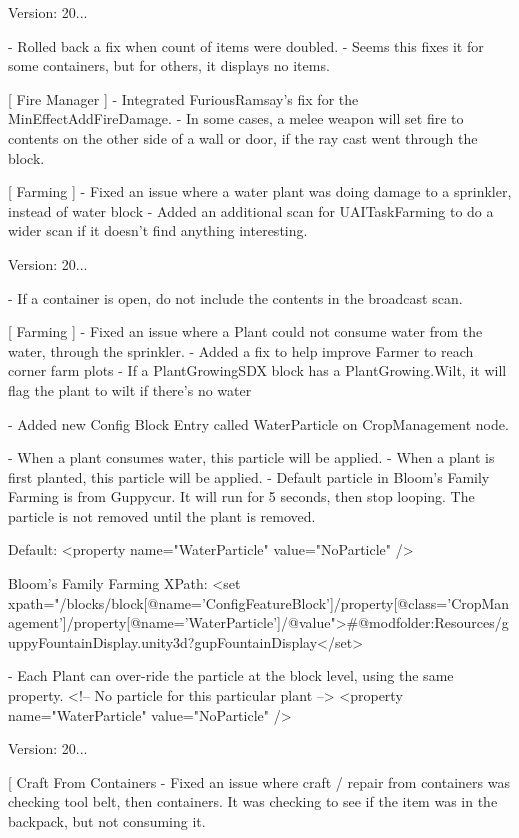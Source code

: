 Version\+: 20... \begin{DoxyVerb}
    - Rolled back a fix when count of items were doubled.
        - Seems this fixes it for some containers, but for others, it displays no items.

[ Fire Manager ]
    - Integrated FuriousRamsay's fix for the MinEffectAddFireDamage.
        - In some cases, a melee weapon will set fire to contents on the other side of a wall or door, if the ray cast went through the block.

[ Farming ]
    - Fixed an issue where a water plant was doing damage to a sprinkler, instead of water block
    - Added an additional scan for UAITaskFarming to do a wider scan if it doesn't find anything interesting.
\end{DoxyVerb}
 Version\+: 20... \begin{DoxyVerb}  
    - If a container is open, do not include the contents in the broadcast scan.

[ Farming ]
    - Fixed an issue where a Plant could not consume water from the water, through the sprinkler.
    - Added a fix to help improve Farmer to reach corner farm plots
    - If a PlantGrowingSDX block has a PlantGrowing.Wilt, it will flag the plant to wilt if there's no water

    - Added new Config Block Entry called WaterParticle on CropManagement node.

        - When a plant consumes water, this particle will be applied.
        - When a plant is first planted, this particle will be applied.
        - Default particle in Bloom's Family Farming is from Guppycur. 
            It will run for 5 seconds, then stop looping.
            The particle is not removed until the plant is removed.

        Default: 
            <property name="WaterParticle" value="NoParticle" />

        Bloom's Family Farming XPath:
            <set xpath="/blocks/block[@name='ConfigFeatureBlock']/property[@class='CropManagement']/property[@name='WaterParticle']/@value">#@modfolder:Resources/guppyFountainDisplay.unity3d?gupFountainDisplay</set>

        - Each Plant can over-ride the particle at the block level, using the same property. 
            <!-- No particle for this particular plant -->
            <property name="WaterParticle" value="NoParticle" />
\end{DoxyVerb}
 Version\+: 20... \begin{DoxyVerb}[ Craft From Containers 
    - Fixed an issue where craft / repair from containers was checking tool belt, then containers. 
        It was checking to see if the item was in the backpack, but not consuming it.
\end{DoxyVerb}


